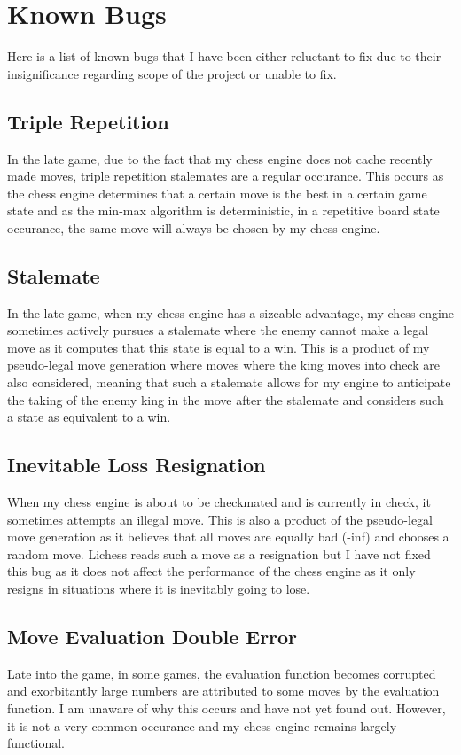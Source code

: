 \chapter{Known Bugs}
Here is a list of known bugs that I have been either reluctant to fix due to their insignificance regarding scope of the project or unable to fix.
\section{Triple Repetition}
In the late game, due to the fact that my chess engine does not cache recently made moves, triple repetition stalemates are a regular occurance. This occurs as the chess engine determines that a certain move is the best in a certain game state and as the min-max algorithm is deterministic, in a repetitive board state occurance, the same move will always be chosen by my chess engine.
\section{Stalemate}
In the late game, when my chess engine has a sizeable advantage, my chess engine sometimes actively pursues a stalemate where the enemy cannot make a legal move as it computes that this state is equal to a win. This is a product of my pseudo-legal move generation where moves where the king moves into check are also considered, meaning that such a stalemate allows for my engine to anticipate the taking of the enemy king in the move after the stalemate and considers such a state as equivalent to a win.
\section{Inevitable Loss Resignation}
When my chess engine is about to be checkmated and is currently in check, it sometimes attempts an illegal move. This is also a product of the pseudo-legal move generation as it believes that all moves are equally bad (-inf) and chooses a random move. Lichess reads such a move as a resignation but I have not fixed this bug as it does not affect the performance of the chess engine as it only resigns in situations where it is inevitably going to lose.
\section{Move Evaluation Double Error}
Late into the game, in some games, the evaluation function becomes corrupted and exorbitantly large numbers are attributed to some moves by the evaluation function. I am unaware of why this occurs and have not yet found out. However, it is not a very common occurance and my chess engine remains largely functional.